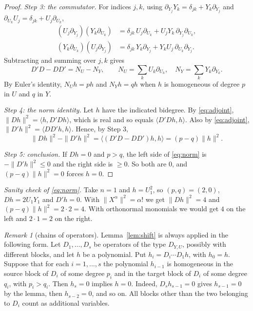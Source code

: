 \documentclass[11pt]{article}
\theoremstyle{remark}
\newtheorem{remark}[theorem]{Remark}
\newcommand{\D}[2]{D_{#1,#2}}
\begin{document}
\begin{proof}
\emph{Step 3: the commutator.}
For indices $j,k$, using
$\partial_{Y_j}Y_k=\delta_{jk}+Y_k\partial_{Y_j}$ and
$\partial_{U_k}U_j=\delta_{jk}+U_j\partial_{U_k}$,
\begin{align*}
 (U_j\partial_{Y_j})(Y_k\partial_{U_k})
 &=\delta_{jk}\,U_j\partial_{U_k}+U_jY_k\,\partial_{Y_j}\partial_{U_k},\\
 (Y_k\partial_{U_k})(U_j\partial_{Y_j})
 &=\delta_{jk}\,Y_k\partial_{Y_j}+Y_kU_j\,\partial_{U_k}\partial_{Y_j}.
\end{align*}
Subtracting and summing over $j,k$ gives
\[
 D'D-DD'=N_U-N_Y,
 \qquad
 N_U=\sum_k U_k\partial_{U_k},\quad
 N_Y=\sum_k Y_k\partial_{Y_k}.
\]
By Euler's identity, $N_Uh=ph$ and $N_Yh=qh$ when $h$ is homogeneous of
degree $p$ in $U$ and $q$ in $Y$.

\emph{Step 4: the norm identity.}
Let $h$ have the indicated bidegree. By \eqref{eq:adjoint},
$\|Dh\|^2=\langle h,D'Dh\rangle$, which is real and so equals
$\langle D'Dh,h\rangle$. Also by \eqref{eq:adjoint},
$\|D'h\|^2=\langle DD'h,h\rangle$. Hence, by Step 3,
\begin{equation}\label{eq:norm}
 \|Dh\|^2-\|D'h\|^2=\langle(D'D-DD')h,h\rangle=(p-q)\|h\|^2.
\end{equation}

\emph{Step 5: conclusion.}
If $Dh=0$ and $p>q$, the left side of \eqref{eq:norm} is
$-\|D'h\|^2\le0$ and the right side is $\ge0$. So both are $0$, and
$(p-q)\|h\|^2=0$ forces $h=0$.
\end{proof}

\emph{Sanity check of \eqref{eq:norm}.} Take $n=1$ and $h=U_1^2$, so
$(p,q)=(2,0)$, $Dh=2U_1Y_1$ and $D'h=0$. With $\|X^\alpha\|^2=\alpha!$ we
get $\|Dh\|^2=4$ and $(p-q)\|h\|^2=2\cdot2=4$. With orthonormal monomials
we would get $4$ on the left and $2\cdot1=2$ on the right.

\begin{remark}[chains of operators]\label{rem:chain}
Lemma~\ref{lem:shift} is always applied in the following form. Let
$D_1,\ldots,D_s$ be operators of the type $\D{Y}{U}$, possibly with
different blocks, and let $h$ be a polynomial. Put
$h_i=D_i\cdots D_1h$, with $h_0=h$. Suppose that for each $i=1,\ldots,s$
the polynomial $h_{i-1}$ is homogeneous in the source block of $D_i$ of
some degree $p_i$ and in the target block of $D_i$ of some degree $q_i$,
with $p_i>q_i$. Then $h_s=0$ implies $h=0$. Indeed,
$D_sh_{s-1}=0$ gives $h_{s-1}=0$ by the lemma, then $h_{s-2}=0$, and so
on. All blocks other than the two belonging to $D_i$ count as additional
variables.
\end{remark}
\end{document}
